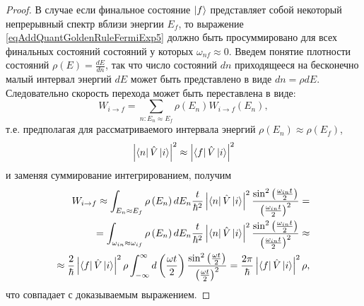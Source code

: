 \begin{proof}
  В случае если финальное состояние $\ket{f}$ представляет
  собой некоторый непрерывный спектр вблизи энергии $E_f$, то
  выражение \eqref{eqAddQuantGoldenRuleFermiExp5} должно быть
  просуммировано для всех финальных состояний состояний у которых
  $\omega_{nf} \approx 0$. Введем понятие плотности состояний
  $\rho(E) = \frac{dE}{dn}$, так что число состояний $dn$ приходящееся
  на бесконечно малый интервал энергий $dE$ может быть представлено в
  виде $dn = \rho dE$. Следовательно скорость перехода может быть
  переставлена в виде:
  \begin{equation}
    W_{i \rightarrow f} = \sum_{n: E_n \approx E_f}
    \rho\left(E_n\right) W_{i \rightarrow f}\left(E_n\right), 
    \nonumber
  \end{equation}
  т.е. предполагая для рассматриваемого интервала энергий
  $\rho\left(E_n\right) \approx \rho\left(E_f\right)$,
  \[
  \left|\bra{n}\hat{V}\ket{i}\right|^2 \approx
  \left|\bra{f}\hat{V}\ket{i}\right|^2
  \]
  и заменяя суммирование интегрированием, получим
  \begin{eqnarray}
    W_{i \rightarrow f} \approx
    \int_{E_n \approx E_f} \rho\left(E_n\right) d E_n      \frac{t}{\hbar^2}
    \left|\bra{n}\hat{V}\ket{i}\right|^2
    \frac{\sin^2\left(\frac{ \omega_{in} t}{2}\right)}
         {\left(\frac{ \omega_{in} t}{2}\right)^2} =
         \\ \nonumber
         = \int_{\omega_{in} \approx \omega_{if}} \rho\left(E_n\right)
         d E_n      \frac{t}{\hbar^2}
    \left|\bra{n}\hat{V}\ket{i}\right|^2
    \frac{\sin^2\left(\frac{ \omega_{in} t}{2}\right)}
         {\left(\frac{ \omega_{in} t}{2}\right)^2} \approx
         \\ \nonumber
    \approx
    \frac{2}{\hbar}
    \left|\bra{f}\hat{V}\ket{i}\right|^2 \rho
    \int_{-\infty}^{\infty}
     d \left(\frac{ \omega t}{2}\right)
    \frac{\sin^2\left(\frac{ \omega t}{2}\right)}
         {\left(\frac{ \omega t}{2}\right)^2} =
    \frac{2 \pi}{\hbar} 
    \left|\bra{f}\hat{V}\ket{i}\right|^2 \rho,
    \label{eqAddQuantGoldenRuleFermiExp6}
  \end{eqnarray}
  что совпадает с доказываемым выражением.
  
  
\end{proof}
